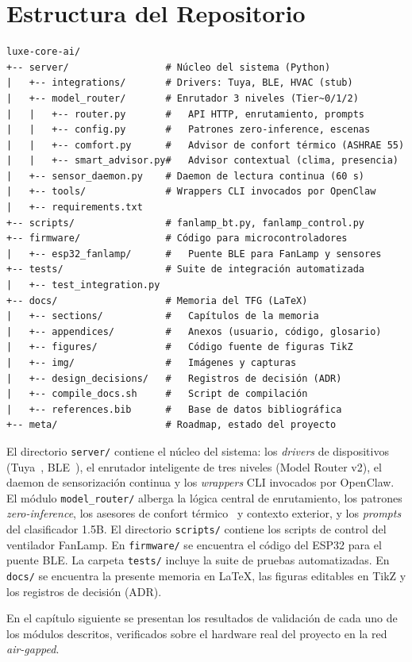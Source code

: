 \section{Estructura del Repositorio}

{\small\begin{verbatim}
luxe-core-ai/
+-- server/                 # Núcleo del sistema (Python)
|   +-- integrations/       # Drivers: Tuya, BLE, HVAC (stub)
|   +-- model_router/       # Enrutador 3 niveles (Tier~0/1/2)
|   |   +-- router.py       #   API HTTP, enrutamiento, prompts
|   |   +-- config.py       #   Patrones zero-inference, escenas
|   |   +-- comfort.py      #   Advisor de confort térmico (ASHRAE 55)
|   |   +-- smart_advisor.py#   Advisor contextual (clima, presencia)
|   +-- sensor_daemon.py    # Daemon de lectura continua (60 s)
|   +-- tools/              # Wrappers CLI invocados por OpenClaw
|   +-- requirements.txt
+-- scripts/                # fanlamp_bt.py, fanlamp_control.py
+-- firmware/               # Código para microcontroladores
|   +-- esp32_fanlamp/      #   Puente BLE para FanLamp y sensores
+-- tests/                  # Suite de integración automatizada
|   +-- test_integration.py
+-- docs/                   # Memoria del TFG (LaTeX)
|   +-- sections/           #   Capítulos de la memoria
|   +-- appendices/         #   Anexos (usuario, código, glosario)
|   +-- figures/            #   Código fuente de figuras TikZ
|   +-- img/                #   Imágenes y capturas
|   +-- design_decisions/   #   Registros de decisión (ADR)
|   +-- compile_docs.sh     #   Script de compilación
|   +-- references.bib      #   Base de datos bibliográfica
+-- meta/                   # Roadmap, estado del proyecto
\end{verbatim}}

\noindent El directorio \texttt{server/} contiene el núcleo del sistema: los \textit{drivers} de dispositivos (Tuya~\cite{tinytuya}, BLE~\cite{bleak}), el enrutador inteligente de tres niveles (Model Router v2), el daemon de sensorización continua y los \textit{wrappers} CLI invocados por OpenClaw. El módulo \texttt{model\_router/} alberga la lógica central de enrutamiento, los patrones \textit{zero-inference}, los asesores de confort térmico~\cite{ashrae55_2023, rothfusz_1990} y contexto exterior, y los \textit{prompts} del clasificador 1.5B. El directorio \texttt{scripts/} contiene los scripts de control del ventilador FanLamp. En \texttt{firmware/} se encuentra el código del ESP32 para el puente BLE. La carpeta \texttt{tests/} incluye la suite de pruebas automatizadas. En \texttt{docs/} se encuentra la presente memoria en \LaTeX{}, las figuras editables en TikZ y los registros de decisión (ADR).

En el capítulo siguiente se presentan los resultados de validación de cada uno de los módulos descritos, verificados sobre el hardware real del proyecto en la red \textit{air-gapped}.
